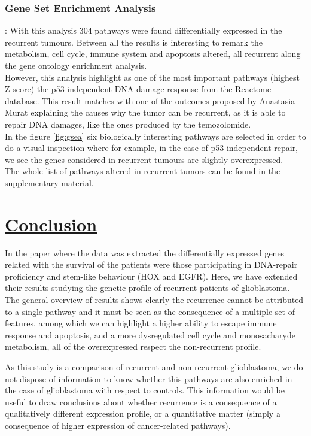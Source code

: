 \documentclass[9pt,twocolumn,twoside]{gsajnl}
\begin{document}
\subsubsection*{Gene Set Enrichment Analysis}: With this analysis 304 pathways were found differentially expressed in the recurrent tumours. Between all the results is interesting to remark the metabolism, cell cycle, immune system and apoptosis altered, all recurrent along the gene ontology enrichment analysis.\\
However, this analysis highlight as one of the most important pathways (highest Z-score) the p53-independent DNA damage response from the Reactome database. This result matches with one of the outcomes proposed by Anastasia Murat \citep{Murat2008} explaining the causes why the tumor can be recurrent, as it is able to repair DNA damages, like the ones produced by the temozolomide.\\
In the figure \ref{fig:gsea} six biologically interesting pathways are selected in order to do a visual inspection where for example, in the case of p53-independent repair, we see the genes considered in recurrent tumours are slightly overexpressed.\\
The whole list of pathways altered in recurrent tumors can be found in the \href{http://ieoproject.tk/ieo/abella_casals_miravet.html}{supplementary material}.
\section*{\underline{Conclusion}}
In the paper where the data was extracted \citep{Murat2008} the differentially expressed genes related with the survival of the patients were those participating in DNA-repair proficiency and stem-like behaviour (HOX and EGFR). Here, we have extended their results studying the genetic profile of recurrent patients of glioblastoma. The general overview of results shows clearly the recurrence cannot be attributed to a single pathway and it must be seen as the consequence of a multiple set of features, among which we can highlight a higher ability to escape immune response and apoptosis, and a more dysregulated cell cycle and monosacharyde metabolism, all of the overexpressed respect the non-recurrent profile.

As this study is a comparison of recurrent and non-recurrent glioblastoma, we do not dispose of information to know whether this pathways are also enriched in the case of glioblastoma with respect to controls. This information would be useful to draw conclusions about whether recurrence is a consequence of a qualitatively different expression profile, or a quantitative matter (simply a consequence of higher expression of cancer-related pathways).
\end{document}

